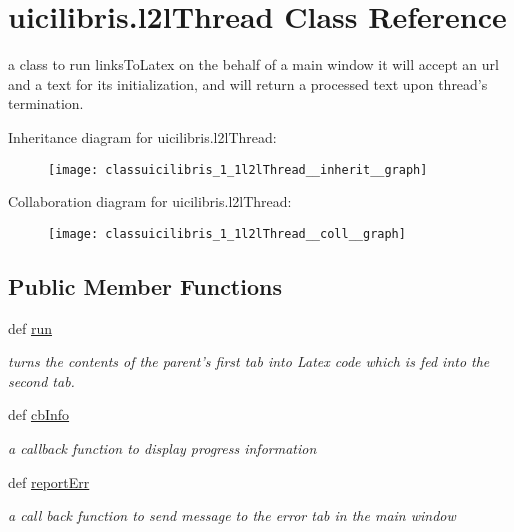 \hypertarget{classuicilibris_1_1l2lThread}{\section{uicilibris.\-l2l\-Thread \-Class \-Reference}
\label{classuicilibris_1_1l2lThread}
}


a class to run links\-To\-Latex on the behalf of a main window it will accept an url and a text for its initialization, and will return a processed text upon thread's termination.  




\-Inheritance diagram for uicilibris.\-l2l\-Thread\-:
\nopagebreak
\begin{figure}[H]
\begin{center}
\leavevmode
\texttt{[image: classuicilibris\_1\_1l2lThread\_\_inherit\_\_graph]}
\end{center}
\end{figure}


\-Collaboration diagram for uicilibris.\-l2l\-Thread\-:
\nopagebreak
\begin{figure}[H]
\begin{center}
\leavevmode
\texttt{[image: classuicilibris\_1\_1l2lThread\_\_coll\_\_graph]}
\end{center}
\end{figure}
\subsection*{\-Public \-Member \-Functions}
\begin{DoxyCompactItemize}
\item 
def \hyperlink{classuicilibris_1_1l2lThread_a53c112a8443b3513c09e38612e867079}{run}
\begin{DoxyCompactList}\small\item\em turns the contents of the parent's first tab into \-Latex code which is fed into the second tab. \end{DoxyCompactList}\item 
def \hyperlink{classuicilibris_1_1l2lThread_a28397d7c4810cb174522c80b5598f14f}{cb\-Info}
\begin{DoxyCompactList}\small\item\em a callback function to display progress information \end{DoxyCompactList}\item 
def \hyperlink{classuicilibris_1_1l2lThread_a4518679cb4b77fc594a17e1754b2c27f}{report\-Err}
\begin{DoxyCompactList}\small\item\em a call back function to send message to the error tab in the main window \end{DoxyCompactList}\end{DoxyCompactItemize}


